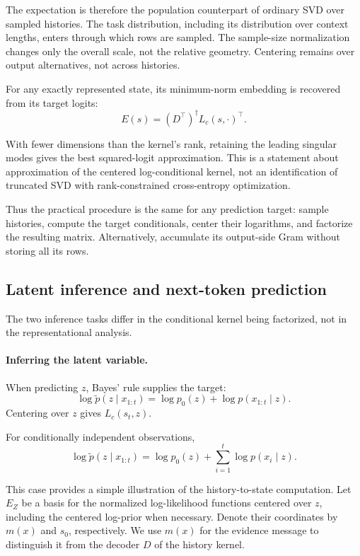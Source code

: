 The expectation is therefore the population counterpart of ordinary SVD over sampled histories. The task distribution, including its distribution over context lengths, enters through which rows are sampled. The sample-size normalization changes only the overall scale, not the relative geometry. Centering remains over output alternatives, not across histories.

For any exactly represented state, its minimum-norm embedding is recovered from its target logits:
\[
\boxed{
E(s)
=
(D^\top)^\dagger L_c(s,\cdot)^\top.
}
\]

With fewer dimensions than the kernel's rank, retaining the leading singular modes gives the best squared-logit approximation. This is a statement about approximation of the centered log-conditional kernel, not an identification of truncated SVD with rank-constrained cross-entropy optimization.

Thus the practical procedure is the same for any prediction target: sample histories, compute the target conditionals, center their logarithms, and factorize the resulting matrix. Alternatively, accumulate its output-side Gram without storing all its rows.

\subsection{Latent inference and next-token prediction}

The two inference tasks differ in the conditional kernel being factorized, not in the representational analysis.

\paragraph{Inferring the latent variable.}

When predicting $z$, Bayes' rule supplies the target:
\[
\log\tilde p(z\mid x_{1:t})
=
\log p_0(z)+\log p(x_{1:t}\mid z).
\]
Centering over $z$ gives $L_c(s_t,z)$.

For conditionally independent observations,
\[
\log\tilde p(z\mid x_{1:t})
=
\log p_0(z)+\sum_{i=1}^t\log p(x_i\mid z).
\]

This case provides a simple illustration of the history-to-state computation. Let $E_Z$ be a basis for the normalized log-likelihood functions centered over $z$, including the centered log-prior when necessary. Denote their coordinates by $m(x)$ and $s_0$, respectively. We use $m(x)$ for the evidence message to distinguish it from the decoder $D$ of the history kernel.

